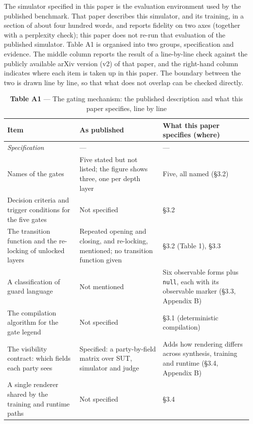\documentclass[letterpaper]{article}
\begin{document}
The simulator specified in this paper is the evaluation environment used by the published benchmark. That paper describes this simulator, and its training, in a section of about four hundred words, and reports fidelity on two axes (together with a perplexity check); this paper does not re-run that evaluation of the published simulator. Table A1 is organised into two groups, specification and evidence. The middle column reports the result of a line-by-line check against the publicly available arXiv version (v2) of that paper, and the right-hand column indicates where each item is taken up in this paper. The boundary between the two is drawn line by line, so that what does not overlap can be checked directly.


\begin{table}[t]
\centering\footnotesize
\setlength{\tabcolsep}{4pt}
\caption{\textbf{Table A1} --- The gating mechanism: the published description and what this paper specifies, line by line}
\begin{tabular}{@{}>{\raggedright\arraybackslash}p{}>{\raggedright\arraybackslash}p{}>{\raggedright\arraybackslash}p{}@{}}
\toprule
Item & As published & What this paper specifies (where) \\
\midrule
\textit{Specification} & --- & --- \\
Names of the gates & Five stated but not listed; the figure shows three, one per depth layer & Five, all named (\S{}3.2) \\
Decision criteria and trigger conditions for the five gates & Not specified & \S{}3.2 \\
The transition function and the re-locking of unlocked layers & Repeated opening and closing, and re-locking, mentioned; no transition function given & \S{}3.2 (Table 1), \S{}3.3 \\
A classification of guard language & Not mentioned & Six observable forms plus \texttt{null}, each with its observable marker (\S{}3.3, Appendix B) \\
The compilation algorithm for the gate legend & Not specified & \S{}3.1 (deterministic compilation) \\
The visibility contract: which fields each party sees & Specified: a party-by-field matrix over SUT, simulator and judge & Adds how rendering differs across synthesis, training and runtime (\S{}3.4, Appendix B) \\
A single renderer shared by the training and runtime paths & Not specified & \S{}3.4 \\

\end{tabular}
\end{table}
\end{document}
